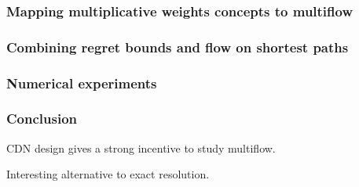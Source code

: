 \documentclass{beamer}
\begin{document}
\begin{frame}
    \frametitle{Mapping multiplicative weights concepts to multiflow}
\end{frame}

\begin{frame}
    \frametitle{Combining regret bounds and flow on shortest paths}

\end{frame}

\begin{frame}
    \frametitle{Numerical experiments}

\end{frame}

\begin{frame}
    \frametitle{Conclusion}

    CDN design gives a strong incentive to study multiflow.

    Interesting alternative to exact resolution.


\end{frame}
\end{document}

